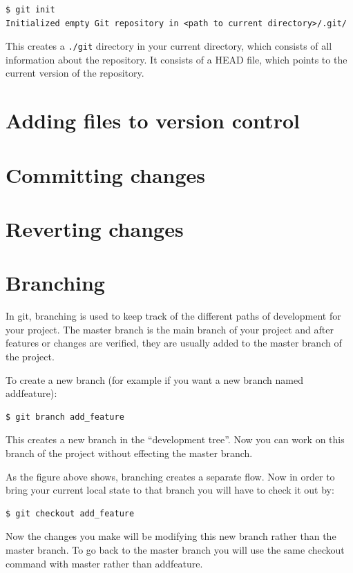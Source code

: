 \documentclass{amsart}
\begin{document}
\begin{verbatim}
$ git init
Initialized empty Git repository in <path to current directory>/.git/
\end{verbatim}

\bigskip
\noindent
This creates a \verb|./git| directory in your current directory, which consists of all information about the repository. It consists of a HEAD file, which points to the current version of the repository.


\newpage

\section*{Adding files to version control}

\section*{Committing changes}

\section*{Reverting changes}

\section*{Branching}

In git, branching is used to keep track of the different paths of development for your project.  The master branch is the main branch of your project and after features or changes are verified, they are usually added to the master branch of the project.

To create a new branch (for example if you want a new branch named addfeature):
\begin{verbatim}
$ git branch add_feature
\end{verbatim}
	
This creates a new branch in the “development tree”.  Now you can work on this branch of the project without effecting the master branch.


As the figure above shows, branching creates a separate flow.  Now in order to bring your current local state to that branch you will have to check it out by:

\begin{verbatim}
$ git checkout add_feature
\end{verbatim}	

Now the changes you make will be modifying this new branch rather than the master branch.  To go back to the master branch you will use the same checkout command with master rather than addfeature.
\end{document}

